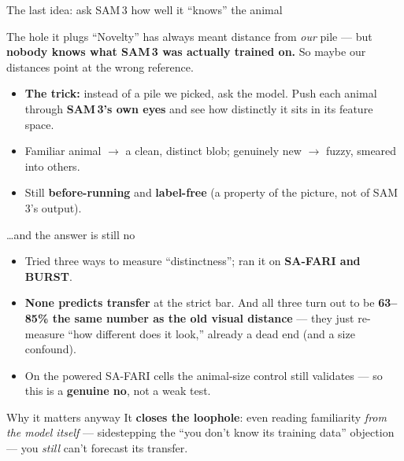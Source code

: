 \documentclass[aspectratio=169,11pt]{beamer}
\begin{document}
\begin{frame}{The last idea: ask SAM\,3 how well it ``knows'' the animal}
  \begin{block}{The hole it plugs}
    \centering\footnotesize
    ``Novelty'' has always meant distance from \emph{our} pile --- but \textbf{nobody knows what SAM\,3 was
    actually trained on.} So maybe our distances point at the wrong reference.
  \end{block}
  \vspace{0.4em}
  \begin{itemize}\footnotesize
    \item \textbf{The trick:} instead of a pile we picked, ask the model. Push each animal through \textbf{SAM\,3's
          own eyes} and see how distinctly it sits in its feature space.
    \item Familiar animal $\to$ a clean, distinct blob; genuinely new $\to$ fuzzy, smeared into others.
    \item Still \textbf{before-running} and \textbf{label-free} (a property of the picture, not of SAM\,3's output).
  \end{itemize}
\end{frame}

\begin{frame}{\dots and the answer is still no}
  \begin{itemize}\footnotesize
    \item Tried three ways to measure ``distinctness''; ran it on \textbf{SA-FARI and BURST}.
    \item \textbf{None predicts transfer} at the strict bar. And all three turn out to be \textbf{63--85\% the
          same number as the old visual distance} --- they just re-measure ``how different does it look,''
          already a dead end (and a size confound).
    \item On the powered SA-FARI cells the animal-size control still validates --- so this is a \textbf{genuine
          no}, not a weak test.
  \end{itemize}
  \vspace{0.3em}
  \begin{block}{Why it matters anyway}
    \centering\footnotesize
    It \textbf{closes the loophole}: even reading familiarity \emph{from the model itself} --- sidestepping the
    ``you don't know its training data'' objection --- you \emph{still} can't forecast its transfer.
  \end{block}
\end{frame}
\end{document}
